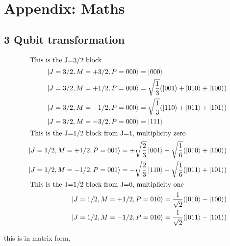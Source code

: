 \appendix
\section{Appendix: Maths}

\subsection{3 Qubit transformation}

\begin{subequations}
\begin{align}
\intertext{ This is the J=3/2 block}
\begin{split}
&\left\vert{J=3/2, M=+3/2, P=000}\right\rangle = \left\vert{000}\right\rangle \\
&\left\vert{J=3/2, M=+1/2, P=000}\right\rangle = \sqrt{\frac{1}{3}}(\left\vert{001}\right\rangle+\left\vert{010}\right\rangle+\left\vert{100}\right\rangle) \\
&\left\vert{J=3/2, M=-1/2, P=000}\right\rangle = \sqrt{\frac{1}{3}}(\left\vert{110}\right\rangle+\left\vert{011}\right\rangle+\left\vert{101}\right\rangle) \\
&\left\vert{J=3/2, M=-3/2, P=000}\right\rangle = \left\vert{111}\right\rangle \\ 
\end{split} \\
\intertext{ This is the J=1/2 block from J=1, multiplicity zero}
\begin{split}
&\left\vert{J=1/2, M=+1/2, P=001}\right\rangle =+\sqrt{\frac{2}{3}}\left\vert{001}\right\rangle - \sqrt{\frac{1}{6}}(\left\vert{010}\right\rangle+\left\vert{100}\right\rangle) \\
&\left\vert{J=1/2, M=-1/2, P=001}\right\rangle =-\sqrt{\frac{2}{3}}\left\vert{110}\right\rangle + \sqrt{\frac{1}{6}}(\left\vert{011}\right\rangle+\left\vert{101}\right\rangle) \\ 
\end{split} \\
\intertext{ This is the J=1/2 block from J=0, multiplicity one}
\begin{split}
&\left\vert{J=1/2, M=+1/2, P=010}\right\rangle = \frac{1}{\sqrt{2}} (\left\vert{010}\right\rangle-\left\vert{100}\right\rangle)\\
&\left\vert{J=1/2, M=-1/2, P=010}\right\rangle = \frac{1}{\sqrt{2}} (\left\vert{011}\right\rangle-\left\vert{101}\right\rangle)\\
\end{split} 
\label{eq:3cgcoeff}
\end{align}
\end{subequations}

this is in matrix form,


